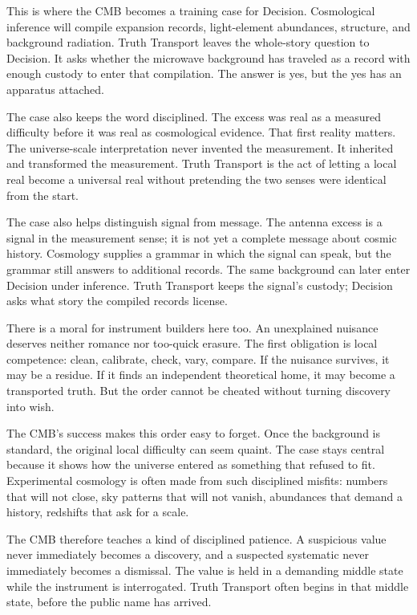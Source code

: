 This is where the CMB becomes a training case for Decision. Cosmological
inference will compile expansion records, light-element abundances,
structure, and background radiation. Truth Transport leaves the
whole-story question to Decision. It asks whether the microwave
background has traveled as a record with enough custody to enter that
compilation. The answer is yes, but the yes has an apparatus attached.

The case also keeps the word  disciplined. The excess was
real as a measured difficulty before it was real as cosmological
evidence. That first reality matters. The universe-scale interpretation
never invented the measurement. It inherited and transformed the
measurement. Truth Transport is the act of letting a local real become a
universal real without pretending the two senses were identical from the
start.

The case also helps distinguish signal from message. The antenna excess
is a signal in the measurement sense; it is not yet a complete message
about cosmic history. Cosmology supplies a grammar in which the signal
can speak, but the grammar still answers to additional records. The same
background can later enter Decision under inference. Truth Transport
keeps the signal's custody; Decision asks what story the compiled
records license.

There is a moral for instrument builders here too. An unexplained
nuisance deserves neither romance nor too-quick erasure. The first
obligation is local competence: clean, calibrate, check, vary, compare.
If the nuisance survives, it may be a residue. If it finds an independent
theoretical home, it may become a transported truth. But the order cannot
be cheated without turning discovery into wish.

The CMB's success makes this order easy to forget. Once the background
is standard, the original local difficulty can seem quaint. The case
stays central because it shows how the universe entered as something
that refused to fit. Experimental cosmology is often made from such
disciplined misfits: numbers that will not close, sky patterns that will
not vanish, abundances that demand a history, redshifts that ask for a
scale.

The CMB therefore teaches a kind of disciplined patience. A suspicious
value never immediately becomes a discovery, and a suspected systematic
never immediately becomes a dismissal. The value is held in a demanding
middle state while the instrument is interrogated. Truth Transport often
begins in that middle state, before the public name has arrived.

